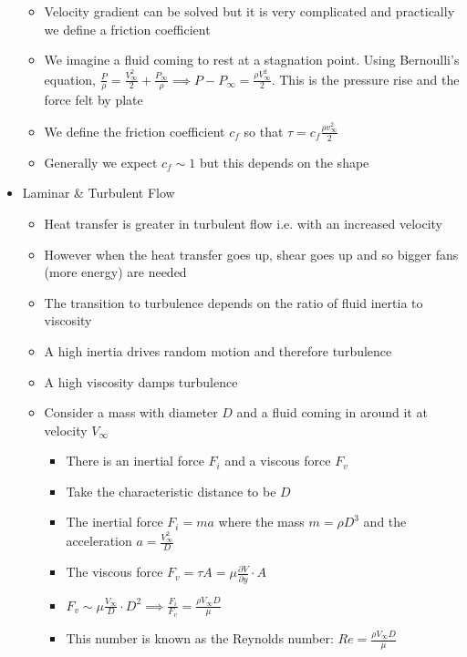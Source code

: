 \documentclass[12pt]{article}
\begin{document}
\begin{itemize}
\begin{itemize}
        \item Velocity gradient can be solved but it is very complicated and practically we define a friction coefficient
        \item We imagine a fluid coming to rest at a stagnation point. Using Bernoulli's equation, $\frac{P}{\rho} = \frac{V_{\infty}^2}{2} + \frac{P_{\infty}}{\rho} \implies P - P_{\infty} = \frac{\rho V_{\infty}^2}{2}$. This is the pressure rise and the force felt by plate
        \item We define the friction coefficient $c_f$ so that $\tau = c_f \frac{\rho v_{\infty}^2}{2}$
        \item Generally we expect $c_f \sim 1$ but this depends on the shape
    \end{itemize}
    \item Laminar \& Turbulent Flow \begin{itemize}
        \item Heat transfer is greater in turbulent flow i.e. with an increased velocity
        \item However when the heat transfer goes up, shear goes up and so bigger fans (more energy) are needed
        \item The transition to turbulence depends on the ratio of fluid inertia to viscosity
        \item A high inertia drives random motion and therefore turbulence
        \item A high viscosity damps turbulence
        \item Consider a mass with diameter $D$ and a fluid coming in around it at velocity $V_{\infty}$ \begin{itemize}
            \item There is an inertial force $F_i$ and a viscous force $F_v$
            \item Take the characteristic distance to be $D$
            \item The inertial force $F_i = ma$ where the mass $m = \rho D^3$ and the acceleration $a = \frac{V_{\infty}^2}{D}$
            \item The viscous force $F_v = \tau A = \mu \frac{\partial V}{\partial y} \cdot A$
            \item $F_v \sim \mu \frac{V_{\infty}}{D} \cdot D^2 \implies \frac{F_i}{F_v} = \frac{\rho V_{\infty}D}{\mu}$
            \item This number is known as the Reynolds number: $Re = \frac{\rho V_{\infty}D}{\mu}$
        \end{itemize}
    \end{itemize}
\end{itemize}
\end{document}
